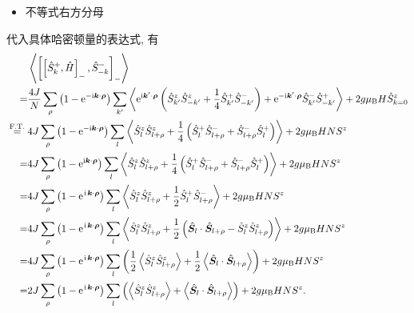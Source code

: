 \begin{itemize}
\item 不等式右方分母
\end{itemize}
代入具体哈密顿量的表达式, 有
\begin{align}
&\left\langle\left[\left[\hat{S}_{k}^{+}, \hat{H}\right]_{-}, \hat{S}_{-k}^{-}\right]_{-}\right\rangle \nonumber\\
=&\frac{4 J}{N} \sum_\rho\left(1-\mathrm{e}^{-\mathrm{i} \boldsymbol{k} \cdot \boldsymbol{\rho}}\right) \sum_{k^{\prime}}\left\langle\mathrm{e}^{\mathrm{i} \boldsymbol{k}^{\prime} \cdot \boldsymbol{\rho}}\left(\hat{S}_{k^{\prime}}^z \hat{S}_{-k^{\prime}}^z+\frac{1}{4} \hat{S}_{k^{\prime}}^{+} \hat{S}_{-k^{\prime}}^{-}\right)+\mathrm{e}^{-\mathrm{i} \boldsymbol{k}^{\prime} \cdot \boldsymbol{\rho}} \hat{S}_{k^{\prime}}^{-} \hat{S}_{-k^{\prime}}^{+}\right\rangle+2 g \mu_{\mathrm{B}} H \hat{S}_{k=0}^z \nonumber\\
\stackrel{\text { F.T. }}{=} & 4 J \sum_{\rho}\left(1-\mathrm{e}^{-\mathrm{i} \boldsymbol{k} \cdot \boldsymbol{\rho}}\right) \sum_{l}\left\langle\hat{S}_{l}^{z} \hat{S}_{l+\rho}^{z}+\frac{1}{4}\left(\hat{S}_{l}^{+} \hat{S}_{l+\rho}^{-}+\hat{S}_{l+\rho}^{-} \hat{S}_{l}^{+}\right)\right\rangle+2 g \mu_{\mathrm{B}} H N S^{z}\nonumber\\
=&4 J \sum_{\rho}\left(1-\mathrm{e}^{\mathrm{i} \boldsymbol{k} \cdot \boldsymbol{\rho}}\right) \sum_{l}\left\langle\hat{S}_{l}^{z} \hat{S}_{l+\rho}^{z}+\frac{1}{4}\left(\hat{S}_{l}^{+} \hat{S}_{l+\rho}^{-}+\hat{S}_{l+\rho}^{-} \hat{S}_{l}^{+}\right)\right\rangle+2 g \mu_{\mathrm{B}} H N S^{z}\label{uneq-bogoliubov} \\
=&4 J \sum_\rho\left(1-\mathrm{e}^{\hspace{0.1em}\mathrm{i}\hspace{0.1em} \boldsymbol{k} \cdot \boldsymbol{\rho}}\right) \sum_l\left\langle\hat{S}_l^z \hat{S}_{l+\rho}^z+\frac{1}{2} \hat{S}_l^{+} \hat{S}_{l+\rho}^{-}\right\rangle+2 g \mu_{\mathrm{B}} H N S^z \nonumber\\
=&4 J \sum_\rho\left(1-\mathrm{e}^{\hspace{0.1em}\mathrm{i}\hspace{0.1em} \boldsymbol{k} \cdot \boldsymbol{\rho}}\right) \sum_l\left\langle\hat{S}_l^z \hat{S}_{l+\rho}^z+\frac{1}{2} \left( \hat{\boldsymbol S}_{l} \cdot \hat{\boldsymbol S}_{l+\rho}-\hat{S}_l^z \hat{S}_{l+\rho}^z\right)\right\rangle+2 g \mu_{\mathrm{B}} H N S^z \nonumber\\
=&4 J \sum_\rho\left(1-\mathrm{e}^{\hspace{0.1em}\mathrm{i}\hspace{0.1em} \boldsymbol{k} \cdot \boldsymbol{\rho}}\right) \sum_l\left(\frac{1}{2}\left\langle\hat{S}_l^z \hat{S}_{l+\rho}^z\right\rangle+\frac{1}{2}\left\langle\hat{\boldsymbol S}_{l} \cdot \hat{\boldsymbol S}_{l+\rho}\right\rangle\right)+2 g \mu_{\mathrm{B}} H N S^z \nonumber\\
=&2 J \sum_\rho\left(1-\mathrm{e}^{\hspace{0.1em}\mathrm{i}\hspace{0.1em} \boldsymbol{k} \cdot \boldsymbol{\rho}}\right) \sum_l\left(\left\langle\hat{S}_l^z \hat{S}_{l+\rho}^z\right\rangle+\left\langle\hat{\boldsymbol S}_{l} \cdot \hat{\boldsymbol S}_{l+\rho}\right\rangle\right)+2 g \mu_{\mathrm{B}} H N S^z.
\end{align}
